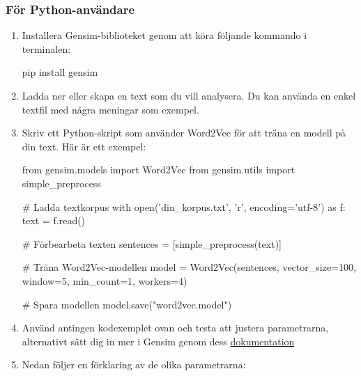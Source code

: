 \documentclass[a4paper, 12pt]{article}
\begin{document}
\subsubsection{För Python-användare}
\begin{enumerate}
    \item Installera Gensim-biblioteket genom att köra följande kommando i terminalen:
    
    \begin{terminalbox}
pip install gensim
    \end{terminalbox}
    
    \item Ladda ner eller skapa en text som du vill analysera. Du kan använda en enkel textfil med några meningar som exempel.
    
    \item Skriv ett Python-skript som använder Word2Vec för att träna en modell på din text. Här är ett exempel:
    \begin{codebox}
from gensim.models import Word2Vec
from gensim.utils import simple_preprocess

# Ladda textkorpus
with open('din_korpus.txt', 'r', encoding='utf-8') as f:
    text = f.read()

# Förbearbeta texten
sentences = [simple_preprocess(text)]

# Träna Word2Vec-modellen
model = Word2Vec(sentences, vector_size=100, window=5, min_count=1, workers=4)

# Spara modellen
model.save("word2vec.model")
    \end{codebox}

    \item Använd antingen kodexemplet ovan och testa att justera parametrarna, alternativt sätt dig in mer i Gensim genom dess \href{https://radimrehurek.com/gensim/auto_examples/index.html}{dokumentation}
    \item Nedan följer en förklaring av de olika parametrarna:
    

\end{enumerate}
\end{document}
